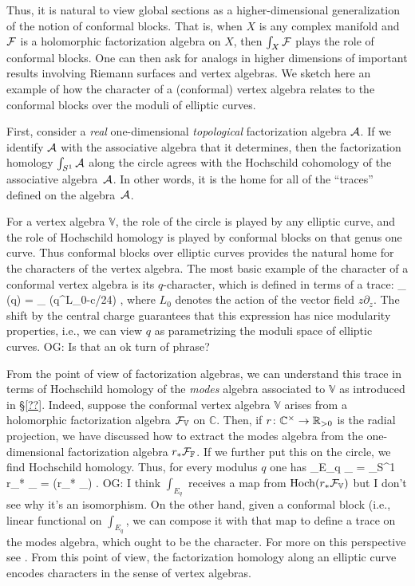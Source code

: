 \documentclass[11pt]{amsart}
\def\del{\partial}
\def\C{{\mathbb{C}}}
\renewcommand{\op}{\operatorname}
\def\owen#1{{\textcolor{violet!50!black}{OG: {#1}}}}
\begin{document}
Thus, it is natural to view global sections as a higher-dimensional generalization of the notion of conformal blocks.
That is, when $X$ is any complex manifold and $\mathcal F$ is a holomorphic factorization algebra on $X$, 
then $\int_X \mathcal F$ plays the role of conformal blocks.
One can then ask for analogs in higher dimensions of important results involving Riemann surfaces and vertex algebras.
We sketch here an example of how the character of a (conformal) vertex algebra relates to the conformal blocks over the moduli of elliptic curves.

First, consider a \textit{real} one-dimensional \textit{topological} factorization algebra $\mathcal A$.
If we identify $\mathcal A$ with the associative algebra that it determines, 
then the factorization homology $\int_{S^1} \mathcal A$ along the circle agrees with the Hochschild cohomology of the associative algebra~$\mathcal A$.
In other words, it is the home for all of the ``traces'' defined on the algebra~$\mathcal A$.

For a vertex algebra $\mathbb{V}$, the role of the circle is played by any elliptic curve,
and the role of Hochschild homology is played by conformal blocks on that genus one curve. 
Thus conformal blocks over elliptic curves provides the natural home for the characters of the vertex algebra.
The most basic example of the character of a conformal vertex algebra is its $q$-character,
which is defined in terms of a trace:
\beqn
\op{char}_{} (q) = \op{Tr}_{} (q^{L_0-c/24}) ,
\eeqn
where $L_0$ denotes the action of the vector field $z \del_z$.
The shift by the central charge guarantees that this expression has nice modularity properties, i.e., we can view $q$ as parametrizing the moduli space of elliptic curves.
\owen{Is that an ok turn of phrase?}

From the point of view of factorization algebras, we can understand this trace in terms of Hochschild homology of the \textit{modes} algebra associated to $\mathbb{V}$ as introduced in \S\ref{??}.
Indeed, suppose the conformal vertex algebra $\mathbb{V}$ arises from a holomorphic factorization algebra $\mathcal F_{\mathbb{V}}$ on $\C$.
Then, if $r \colon \C^\times \to \RR_{>0}$ is the radial projection, we have discussed how to extract the modes algebra from the one-dimensional factorization algebra $r_* \mathcal F_{\mathbb{F}}$.
If we further put this on the circle, we find Hochschild homology.
Thus, for every modulus $q$ one has
\beqn
\int_{E_q} \cF_{} = \int_{S^1} r_* \cF_{} = \op{Hoch}(r_* \cF_{}) .
\eeqn
\owen{I think $\int_{E_q}$ receives a map from $\op{Hoch}(r_* \cF_{\mathbb{V}})$ but I don't see why it's an isomorphism. On the other hand, given a conformal block (i.e., linear functional on $\int_{E_q}$, we can compose it with that map to define a trace on the modes algebra,
which ought to be the character.}
For more on this perspective see \cite{GuiLi}.
From this point of view, the factorization homology along an elliptic curve encodes characters in the sense of vertex algebras.
\end{document}
